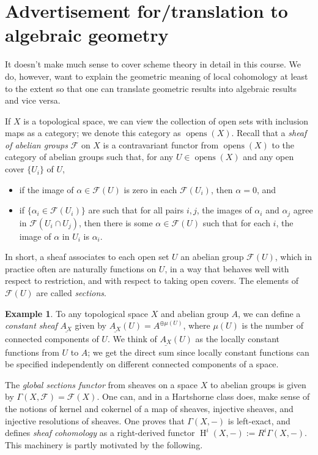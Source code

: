 \documentclass[11pt]{book}
\numberwithin{equation}{section}
\numberwithin{theorem}{chapter}
\theoremstyle{definition}
\newtheorem{example}[theorem]{Example}
\newtheorem*{basic properties}{Basic Properties}
\newtheorem*{Important Remark}{Important Remark}
\theoremstyle{remark}
\newcommand{\cF}{\mathcal{F}}
\newcommand{\opens}{\operatorname{opens}}
\renewcommand{\H}{\operatorname{H}}
\begin{document}
\section{Advertisement for/translation to algebraic geometry}

It doesn't make much sense to cover scheme theory in detail in this course. We do, however, want to explain the geometric meaning of local cohomology at least to the extent so that one can translate geometric results into algebraic results and vice versa.

If $X$ is a topological space, we can view the collection of open sets with inclusion maps as a category; we denote this category as $\opens(X)$.
Recall that a \emph{sheaf of abelian groups} $\cF$ on $X$ is a contravariant functor from $\opens(X)$ to the category of abelian groups such that, for any $U\in \opens(X)$ and any open cover $\{U_i\}$ of $U$, 
\begin{itemize}
	\item if the image of $\alpha\in \cF(U)$ is zero in each $\cF(U_i)$, then $\alpha=0$, and
	\item if $\{\alpha_i\in \cF(U_i)\}$ are such that for all pairs $i,j$, the images of $\alpha_i$ and $\alpha_j$ agree in $\cF(U_i\cap U_j)$, then there is some $\alpha\in \cF(U)$ such that for each $i$, the image of $\alpha$ in $U_i$ is $\alpha_i$.
\end{itemize}

In short, a sheaf associates to each open set $U$ an abelian group $\cF(U)$, which in practice often are naturally functions on $U$, in a way that behaves well with respect to restriction, and with respect to taking open covers. The elements of $\cF(U)$ are called \emph{sections}.

\begin{example}
	To any topological space $X$ and abelian group $A$, we can define a \emph{constant sheaf} $\underline{A_X}$ given by $\underline{A_X}(U)=A^{\oplus \mu(U)}$, where $\mu(U)$ is the number of connected components of $U$. We think of $\underline{A_X}(U)$ as the locally constant functions from $U$ to $A$; we get the direct sum since locally constant functions can be specified independently on different connected components of a space.
\end{example}

The \emph{global sections functor}\index{$\Gamma(X,\cF)$} from sheaves on a space $X$ to abelian groups is given by $\Gamma(X,\cF)=\cF(X)$. One can, and in a Hartshorne class does, make sense of the notions of kernel and cokernel of a map of sheaves, injective sheaves, and injective resolutions of sheaves. One proves that $\Gamma(X,-)$ is left-exact, and defines \emph{sheaf cohomology} as a right-derived functor $\H^i(X,-):=R^i\Gamma(X,-)$. This machinery is partly motivated by the following.
\end{document}
